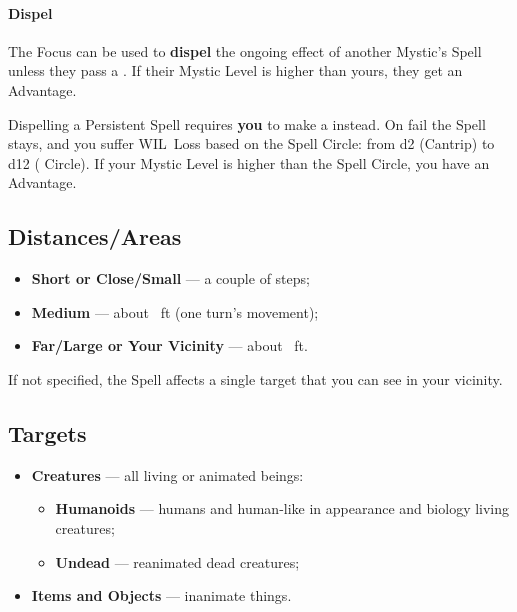 \documentclass[itdr/core]{subfiles}
\begin{document}
\paragraph{Dispel}
The Focus can be used to \textbf{dispel} the ongoing effect of another Mystic's Spell unless they pass a . If their Mystic Level is higher than yours, they get an Advantage.

Dispelling a Persistent Spell requires \textbf{you} to make a  instead. On fail the Spell stays, and you suffer WIL~Loss based on the Spell Circle: from d2 (Cantrip) to d12 ( Circle). If your Mystic Level is higher than the Spell Circle, you have an Advantage.

{\hfill
{}
\hfill}

\enlargethispage{5ex}

\break

\subsection*{Distances/Areas}
\begin{itemize}
	\item \textbf{Short or Close/Small} --- a couple of steps;
	\item \textbf{Medium} --- about \basemove~ft (one turn's movement);
	\item \textbf{Far/Large or Your Vicinity} --- about \the\numexpr{}\relax~ft.
\end{itemize}
If not specified, the Spell affects a single target that you can see in your vicinity.

\subsection*{Targets}
\begin{itemize}
	\item \textbf{Creatures} --- all living or animated beings:
	\begin{itemize}
		\item \textbf{Humanoids} --- humans and human-like in appearance and biology living creatures;
		\item \textbf{Undead} --- reanimated dead creatures;
	\end{itemize}
	\item \textbf{Items and Objects} --- inanimate things.
\end{itemize}
\end{document}

